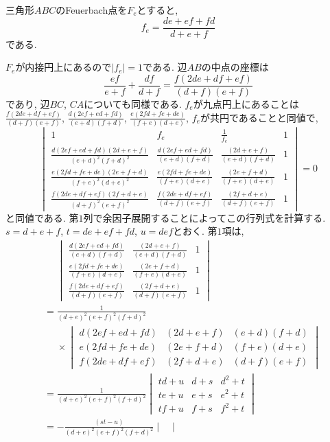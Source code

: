 %
\begin{bthm}\label{thm:feuerbach}
三角形$ABC$のFeuerbach点を$F_e$とすると,
\[f_e=\frac{de+ef+fd}{d+e+f}\]
である.
\end{bthm}
\begin{prf*}
$F_e$が内接円上にあるので$\lvert f_e\rvert=1$である.
辺$AB$の中点の座標は
\[\frac{ef}{e+f}+\frac{df}{d+f}=\frac{f(2de+df+ef)}{(d+f)(e+f)}\]
であり, 辺$BC$, $CA$についても同様である.
$f_e$が九点円上にあることは$\frac{f(2de+df+ef)}{(d+f)(e+f)}$, $\frac{d(2ef+ed+fd)}{(e+d)(f+d)}$, $\frac{e(2fd+fe+de)}{(f+e)(d+e)}$, $f_e$が共円であることと同値で,
\[\begin{vmatrix}
1&f_e&\frac 1{f_e}&1\\
\frac{d(2ef+ed+fd)(2d+e+f)}{(e+d)^2(f+d)^2}&\frac{d(2ef+ed+fd)}{(e+d)(f+d)}&\frac{(2d+e+f)}{(e+d)(f+d)}&1\\
\frac{e(2fd+fe+de)(2e+f+d)}{(f+e)^2(d+e)^2}&\frac{e(2fd+fe+de)}{(f+e)(d+e)}&\frac{(2e+f+d)}{(f+e)(d+e)}&1\\
\frac{f(2de+df+ef)(2f+d+e)}{(d+f)^2(e+f)^2}&\frac{f(2de+df+ef)}{(d+f)(e+f)}&\frac{(2f+d+e)}{(d+f)(e+f)}&1
\end{vmatrix}=0\]
と同値である.
第$1$列で余因子展開することによってこの行列式を計算する.
$s=d+e+f$, $t=de+ef+fd$, $u=def$とおく.
第$1$項は,
\begin{align*}
&\phantom{{}={}}\begin{vmatrix}
\frac{d(2ef+ed+fd)}{(e+d)(f+d)}&\frac{(2d+e+f)}{(e+d)(f+d)}&1\\
\frac{e(2fd+fe+de)}{(f+e)(d+e)}&\frac{(2e+f+d)}{(f+e)(d+e)}&1\\
\frac{f(2de+df+ef)}{(d+f)(e+f)}&\frac{(2f+d+e)}{(d+f)(e+f)}&1
\end{vmatrix}\\
&=\frac{1}{(d+e)^2(e+f)^2(f+d)^2}\\
&\phantom{{}={}}\times\begin{vmatrix}
d(2ef+ed+fd)&(2d+e+f)&(e+d)(f+d)\\
e(2fd+fe+de)&(2e+f+d)&(f+e)(d+e)\\
f(2de+df+ef)&(2f+d+e)&(d+f)(e+f)
\end{vmatrix}\\
&=\frac{1}{(d+e)^2(e+f)^2(f+d)^2}\begin{vmatrix}
td+u&d+s&d^2+t\\
te+u&e+s&e^2+t\\
tf+u&f+s&f^2+t
\end{vmatrix}\\
&=-\frac{(st-u)}{(d+e)^2(e+f)^2(f+d)^2}\begin{vmatrix}

\end{vmatrix}
\end{align*}
\end{prf*}
